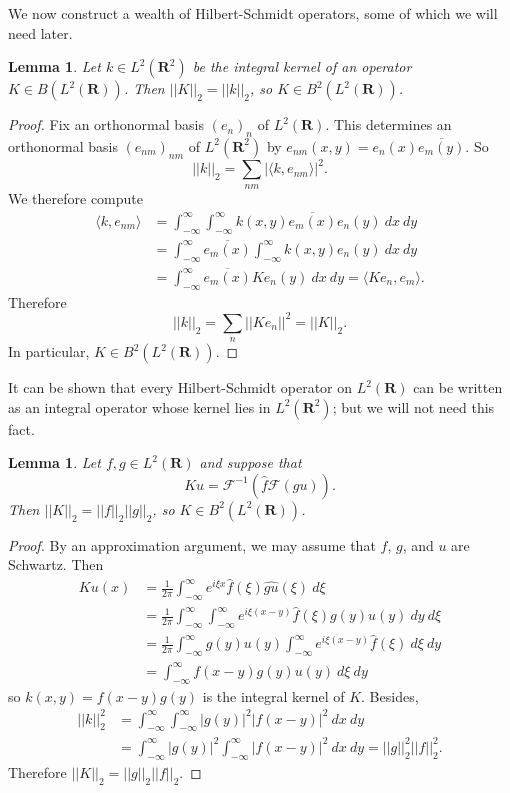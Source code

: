 \documentclass[12pt]{report}
\newcommand{\RR}{\mathbf{R}}
\newtheorem{lemma}[theorem]{Lemma}
\theoremstyle{definition}
\begin{document}
We now construct a wealth of Hilbert-Schmidt operators, some of which we will need later.
\begin{lemma}
Let $k \in L^2(\RR^2)$ be the integral kernel of an operator $K \in B(L^2(\RR))$. Then $||K||_2 = ||k||_2$, so $K \in B^2(L^2(\RR))$.
\end{lemma}
\begin{proof}
Fix an orthonormal basis $(e_n)_n$ of $L^2(\RR)$. This determines an orthonormal basis $(e_{nm})_{nm}$ of $L^2(\RR^2)$ by $e_{nm}(x, y) = e_n(x) \overline{e_m(y)}$. So
$$||k||_2 = \sum_{nm} |\langle k, e_{nm}\rangle|^2.$$
We therefore compute
\begin{align*}
  \langle k, e_{nm}\rangle &= \int_{-\infty}^\infty \int_{-\infty}^\infty k(x, y) \overline{e_m(x)} e_n(y) ~dx ~dy\\
  &= \int_{-\infty}^\infty \overline{e_m(x)} \int_{-\infty}^\infty k(x, y) e_n(y) ~dx ~dy\\
  &= \int_{-\infty}^\infty \overline{e_m(x)} Ke_n(y) ~dx ~dy = \langle Ke_n, e_m\rangle.
\end{align*}
Therefore
$$||k||_2 = \sum_n ||Ke_n||^2 = ||K||_2.$$
In particular, $K \in B^2(L^2(\RR))$.
\end{proof}
It can be shown that every Hilbert-Schmidt operator on $L^2(\RR)$ can be written as an integral operator whose kernel lies in $L^2(\RR^2)$; but we will not need this fact.
\begin{lemma}
Let $f, g \in L^2(\RR)$ and suppose that
$$Ku = \mathcal F^{-1}(\hat f \mathcal F(gu)).$$
Then $||K||_2 = ||f||_2||g||_2$, so $K \in B^2(L^2(\RR))$.
\end{lemma}
\begin{proof}
By an approximation argument, we may assume that $f$, $g$, and $u$ are Schwartz. Then
\begin{align*}
Ku(x) &= \frac{1}{2\pi} \int_{-\infty}^\infty e^{i\xi x} \hat f(\xi) \widehat{gu}(\xi) ~d\xi \\
  &= \frac{1}{2\pi} \int_{-\infty}^\infty \int_{-\infty}^\infty e^{i\xi(x - y)} \hat f(\xi) g(y) u(y) ~dy ~d\xi\\
  &= \frac{1}{2\pi} \int_{-\infty}^\infty g(y)u(y) \int_{-\infty}^\infty e^{i\xi(x - y)} \hat f(\xi) ~d\xi ~dy\\
  &= \int_{-\infty}^\infty f(x - y) g(y) u(y) ~d\xi~dy
\end{align*}
so $k(x, y) = f(x - y) g(y)$ is the integral kernel of $K$. Besides,
\begin{align*}
  ||k||_2^2 &= \int_{-\infty}^\infty \int_{-\infty}^\infty |g(y)|^2 |f(x - y)|^2 ~dx ~dy
  \\&= \int_{-\infty}^\infty |g(y)|^2 \int_{-\infty}^\infty |f(x - y)|^2 ~dx ~dy = ||g||_2^2||f||_2^2.
\end{align*}
Therefore $||K||_2 = ||g||_2 ||f||_2$.
\end{proof}
\end{document}

